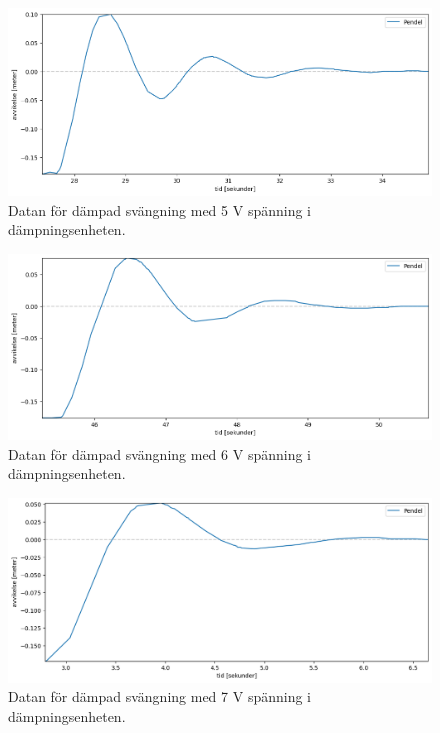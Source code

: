 \documentclass[12pt, a4paper]{article}
\begin{document}
\begin{figure}[hp]
    \includegraphics[width=\textwidth]{graf_5_v_centered.png}
    \caption{Datan för dämpad svängning med 5 V spänning i dämpningsenheten.}
    \label{fig:data_5_v}
\end{figure}

\begin{figure}[hp]
    \includegraphics[width=\textwidth]{graf_6_v_centered.png}
    \caption{Datan för dämpad svängning med 6 V spänning i dämpningsenheten.}
    \label{fig:data_6_v}
\end{figure}

\begin{figure}[hp]
    \includegraphics[width=\textwidth]{graf_7_v_centered.png}
    \caption{Datan för dämpad svängning med 7 V spänning i dämpningsenheten.}
    \label{fig:data_7_v}
\end{figure}
\end{document}
